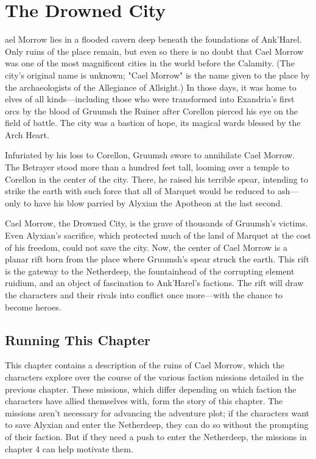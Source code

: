 \documentclass[10pt,a4paper,twoside,fancy,bg=print,twocolumn,openany,nodeprecatedcode]{dndbook}
\begin{document}
\chapter{The Drowned City}
ael Morrow lies in a flooded cavern deep beneath the foundations of Ank'Harel. Only ruins of the place remain, but even so there is no doubt that Cael Morrow was one of the most magnificent cities in the world before the Calamity. (The city's original name is unknown; "Cael Morrow" is the name given to the place by the archaeologists of the Allegiance of Allsight.) In those days, it was home to elves of all kinds—including those who were transformed into Exandria's first orcs by the blood of Gruumsh the Ruiner after Corellon pierced his eye on the field of battle. The city was a bastion of hope, its magical wards blessed by the Arch Heart.


Infuriated by his loss to Corellon, Gruumsh swore to annihilate Cael Morrow. The Betrayer stood more than a hundred feet tall, looming over a temple to Corellon in the center of the city. There, he raised his terrible spear, intending to strike the earth with such force that all of Marquet would be reduced to ash—only to have his blow parried by Alyxian the Apotheon at the last second.

Cael Morrow, the Drowned City, is the grave of thousands of Gruumsh's victims. Even Alyxian's sacrifice, which protected much of the land of Marquet at the cost of his freedom, could not save the city. Now, the center of Cael Morrow is a planar rift born from the place where Gruumsh's spear struck the earth. This rift is the gateway to the Netherdeep, the fountainhead of the corrupting element ruidium, and an object of fascination to Ank'Harel's factions. The rift will draw the characters and their rivals into conflict once more—with the chance to become heroes.

\section{Running This Chapter}
This chapter contains a description of the ruins of Cael Morrow, which the characters explore over the course of the various faction missions detailed in the previous chapter. These missions, which differ depending on which faction the characters have allied themselves with, form the story of this chapter. The missions aren't necessary for advancing the adventure plot; if the characters want to save Alyxian and enter the Netherdeep, they can do so without the prompting of their faction. But if they need a push to enter the Netherdeep, the missions in chapter 4 can help motivate them.
\end{document}
